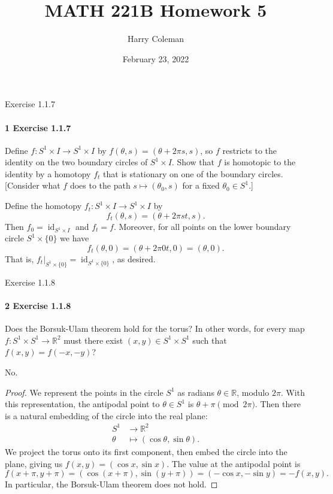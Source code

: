 \documentclass[12pt]{article}
\renewcommand{\maketitle}{\thispagestyle{title}}
\newlength{\myparskip}
\newenvironment{fullbox}{\begin{lrbox}{\savefullbox}\begin{minipage}{\dimexpr\textwidth-2\fboxsep\relax}\setlength{\parskip}{\myparskip}}{\end{minipage}\end{lrbox}\framebox[\textwidth]{\usebox{\savefullbox}}}
\newenvironment{pbox}[1][]{\begin{fullbox}\ifx#1\empty\else\paragraph{#1}\phantom{}\fi}{\end{fullbox}}
\theoremstyle{definition}
\newcommand{\R}{\mathbb{R}}
\newcommand{\<}{\langle}
\renewcommand{\>}{\rangle}
\DeclareMathOperator{\id}{id}
\begin{document}
\title{MATH 221B Homework 5}
\author{Harry Coleman}
\date{February 23, 2022}
\maketitle


\begin{pbox}[1 Exercise 1.1.7]
    Define $f : S^1 \times I \to S^1 \times I$ by $f(\theta, s) = (\theta + 2\pi s, s)$, so $f$ restricts to the identity on the two boundary circles of $S^1 \times I$.
    Show that $f$ is homotopic to the identity by a homotopy $f_t$ that is stationary on one of the boundary circles.
    [Consider what $f$ does to the path $s \mapsto (\theta_0, s)$ for a fixed $\theta_0 \in S^1$.]
\end{pbox}

Define the homotopy $f_t : S^1 \times I \to S^1 \times I$ by
\[
    f_t(\theta, s) = (\theta + 2\pi st, s).
\]
Then $f_0 = \id_{S^1 \times I}$ and $f_t = f$.
Moreover, for all points on the lower boundary circle $S^1 \times \{0\}$ we have
\[
    f_t(\theta, 0) = (\theta + 2\pi 0t, 0) = (\theta, 0).
\]
That is, $f_t|_{S^1 \times \{0\}} = \id_{S^1 \times \{0\}}$, as desired.


\begin{pbox}[2 Exercise 1.1.8]
    Does the Borsuk-Ulam theorem hold for the torus?
    In other words, for every map $f : S^1 \times S^1 \to \R^2$ must there exist $(x, y) \in S^1 \times S^1$ such that $f(x, y) = f(-x, -y)$?
\end{pbox}

No.

\begin{proof}
    We represent the points in the circle $S^1$ as radians $\theta \in \R$, modulo $2\pi$.
    With this representation, the antipodal point to $\theta \in S^1$ is $\theta + \pi \pmod{2\pi}$.
    Then there is a natural embedding of the circle into the real plane:
    \begin{align*}
        S^1 &\longrightarrow \R^2 \\
        \theta &\longmapsto (\cos\theta, \sin\theta).
    \end{align*}
    We project the torus onto its first component, then embed the circle into the plane, giving us $f(x, y) = (\cos x, \sin x)$.
    The value at the antipodal point is
    \[
        f(x + \pi, y + \pi)
            = (\cos(x + \pi), \sin(y + \pi))
            = (-\cos x, -\sin y)
            = -f(x, y).
    \]
    In particular, the Borsuk-Ulam theorem does not hold.
\end{proof}
\end{document}
